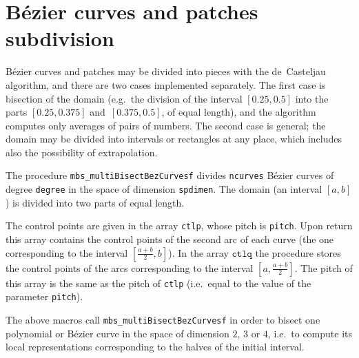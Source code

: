 

\section{B\'{e}zier curves and patches subdivision}

B\'{e}zier curves and patches may be divided into pieces with the de~Casteljau
algorithm, and there are two cases implemented separately.
The first case is bisection of the domain (e.g.\ the division of the
interval $[0.25,0.5]$ into the parts $[0.25,0.375]$
and~$[0.375,0.5]$, of equal length), and the algorithm computes only
averages of pairs of numbers. The second case is general; the domain
may be divided into intervals or rectangles at any place, which includes
also the possibility of extrapolation.

\vspace{\bigskipamount}
The procedure \texttt{mbs\_multiBisectBezCurvesf} divides \texttt{ncurves}
B\'{e}zier curves of degree \texttt{degree} in the space of dimension
\texttt{spdimen}. The domain (an interval $[a,b]$) is divided into two
parts of equal length.

\begin{sloppypar}
The control points are given in the array \texttt{ctlp}, whose pitch is
\texttt{pitch}. Upon return this array contains the control points of the second
arc of each curve (the one corresponding to the interval $[\frac{a+b}{2},b]$).
In the array $\texttt{ctlq}$ the procedure stores the control points of the
arcs corresponding to the interval $[a,\frac{a+b}{2}]$. The pitch of
this array is the same as the pitch of \texttt{ctlp} (i.e.\ equal to
the value of the parameter \texttt{pitch}).
\end{sloppypar}

\vspace{\bigskipamount}
The above macros call \texttt{mbs\_multiBisectBezCurvesf} in order to
bisect one polynomial or B\'{e}zier curve in the space of dimension $2$, $3$
or $4$, i.e.\ to compute its local representations corresponding to the
halves of the initial interval.

